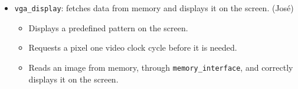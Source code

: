 \documentclass{article}
\begin{document}
\begin{itemize}
\item[] {\tt vga\_display}: fetches data from memory and displays it on the screen. (Jos\'{e})
	\begin{itemize}
	\item Displays a predefined pattern on the screen.
	\item Requests a pixel one video clock cycle before it is needed.
	\item Reads an image from memory, through {\tt memory\_interface}, and correctly displays it on the screen.
	\end{itemize}

\end{itemize}
\end{document}
